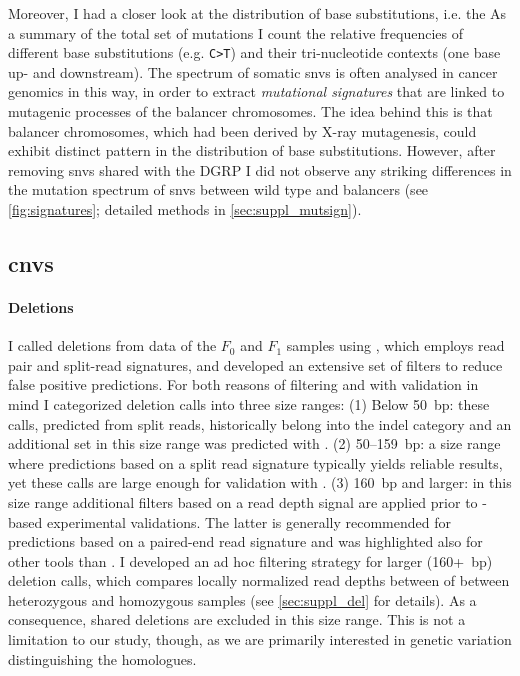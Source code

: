 Moreover, I had a closer look at the distribution of base
substitutions, i.e. the 
    {As a summary of the total set of
    mutations I count the relative frequencies of different base substitutions
    (e.g. \texttt{C>T}) and their tri-nucleotide contexts (one base up- and
    downstream). The spectrum of somatic \acp{snv} is often analysed in cancer
    genomics in this way, in order to extract \emph{mutational signatures} that
    are linked to mutagenic processes}
of the balancer chromosomes. The idea behind this is that balancer chromosomes,
which had been derived by X-ray mutagenesis, could exhibit distinct pattern in
the distribution of base substitutions. However, after removing \acp{snv}
shared with the DGRP I did not observe any striking differences in the mutation
spectrum of \acp{snv} between wild type and balancers (see
\cref{fig:signatures}; detailed methods in \cref{sec:suppl_mutsign}).






\subsection{\texorpdfstring{\Aclp{cnv}}{Copy number variants}}
\label{sec:balancer_cnv}

\paragraph{Deletions} I called deletions from \wgs data of the $F_0$ and $F_1$
samples using \delly, which employs read pair and split-read signatures, and developed an
extensive set of filters to reduce false positive predictions. For both reasons
of filtering and with validation in mind I categorized deletion calls into three
size ranges: (1) Below 50~bp: these calls, predicted from split reads,
historically belong into the indel category and an additional set in this size
range was predicted with \freebayes. (2) 50--159~bp: a size range where
predictions based on a split read signature typically yields reliable results,
yet these calls are large enough for validation with \pcr.
(3) 160~bp and larger: in this size range additional filters based on a
read depth signal are applied prior to \pcr-based experimental validations.
The latter is generally recommended for \cnv predictions based on a paired-end read
signature and was highlighted also for other tools than \delly
\citep[for example]{Layer2014}. I developed an ad hoc filtering strategy
for larger (160+~bp) deletion calls, which compares locally normalized
read depths between of between heterozygous and homozygous samples (see
\cref{sec:suppl_del} for details). As a consequence, shared deletions are
excluded in this size range. This is not a limitation to our study, though, as
we are primarily interested in genetic variation distinguishing the homologues.

